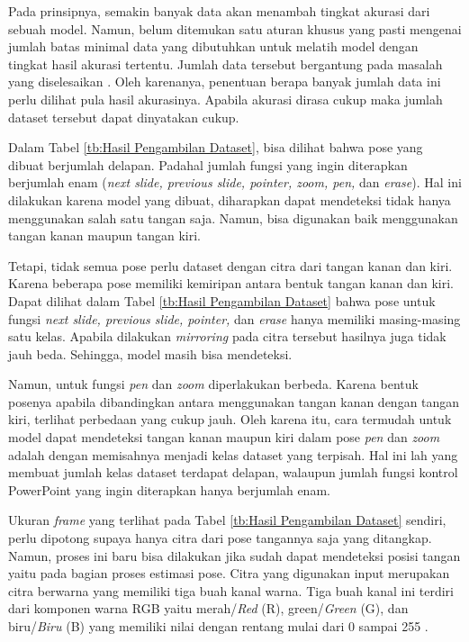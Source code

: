 Pada prinsipnya, semakin banyak data akan menambah tingkat akurasi dari sebuah model. Namun, belum ditemukan satu aturan khusus yang pasti mengenai jumlah batas minimal data yang dibutuhkan untuk melatih model dengan tingkat hasil akurasi tertentu. Jumlah data tersebut bergantung pada masalah yang diselesaikan \parencite{Junghwan}. Oleh karenanya, penentuan berapa banyak jumlah data ini perlu dilihat pula hasil akurasinya. Apabila akurasi dirasa cukup maka jumlah dataset tersebut dapat dinyatakan cukup.

Dalam Tabel \ref{tb:Hasil Pengambilan Dataset}, bisa dilihat bahwa pose yang dibuat berjumlah delapan. Padahal jumlah fungsi yang ingin diterapkan berjumlah enam (\emph{next slide, previous slide, pointer, zoom, pen,} dan \emph{erase}). Hal ini dilakukan karena model yang dibuat, diharapkan dapat mendeteksi tidak hanya menggunakan salah satu tangan saja. Namun, bisa digunakan baik menggunakan tangan kanan maupun tangan kiri. 

Tetapi, tidak semua pose perlu dataset dengan citra dari tangan kanan dan kiri. Karena beberapa pose memiliki kemiripan antara bentuk tangan kanan dan kiri. Dapat dilihat dalam Tabel \ref{tb:Hasil Pengambilan Dataset} bahwa pose untuk fungsi \emph{next slide, previous slide, pointer,} dan \emph{erase} hanya memiliki masing-masing satu kelas. Apabila dilakukan \emph{mirroring} pada citra tersebut hasilnya juga tidak jauh beda. Sehingga, model masih bisa mendeteksi.

Namun, untuk fungsi \emph{pen} dan \emph{zoom} diperlakukan berbeda. Karena bentuk posenya apabila dibandingkan antara menggunakan tangan kanan dengan tangan kiri, terlihat perbedaan yang cukup jauh. Oleh karena itu, cara termudah untuk model dapat mendeteksi tangan kanan maupun kiri dalam pose \emph{pen} dan \emph{zoom} adalah dengan memisahnya menjadi kelas dataset yang terpisah. Hal ini lah yang membuat jumlah kelas dataset terdapat delapan, walaupun jumlah fungsi kontrol PowerPoint yang ingin diterapkan hanya berjumlah enam.

Ukuran \emph{frame} yang terlihat pada Tabel \ref{tb:Hasil Pengambilan Dataset} sendiri, perlu dipotong supaya hanya citra dari pose tangannya saja yang ditangkap. Namun, proses ini baru bisa dilakukan jika sudah dapat mendeteksi posisi tangan yaitu pada bagian proses estimasi pose. Citra yang digunakan input merupakan citra berwarna yang memiliki tiga buah kanal warna. Tiga buah kanal ini terdiri dari komponen warna RGB yaitu merah/\emph{Red} (R), green/\emph{Green} (G), dan biru/\emph{Biru} (B) yang memiliki nilai dengan rentang mulai dari 0 sampai 255 \parencite{PriyantoHidayatullah}. 

